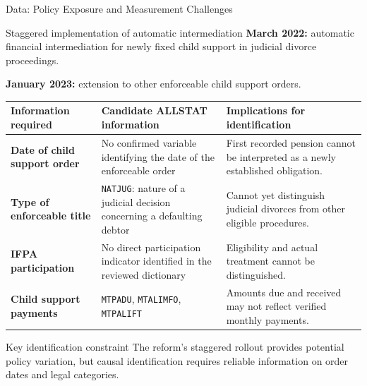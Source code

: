 \documentclass[aspectratio=169,10pt]{beamer}
\begin{document}
\begin{frame}{Data: Policy Exposure and Measurement Challenges}

\small

\begin{block}{Staggered implementation of automatic intermediation}
\textbf{March 2022:} automatic financial intermediation
for newly fixed child support in judicial divorce proceedings.

\textbf{January 2023:} extension to other enforceable
child support orders.
\end{block}

\vspace{0.12cm}

\scriptsize
\renewcommand{\arraystretch}{1.20}
\setlength{\tabcolsep}{4pt}

\begin{tabularx}{\textwidth}{
>{\bfseries}p{2.7cm} p{3.7cm} X
}
\toprule
Information required &
Candidate ALLSTAT information &
Implications for identification \\
\midrule

Date of child support order &
No confirmed variable identifying the date
of the enforceable order &
First recorded pension cannot be interpreted
as a newly established obligation. \\

Type of enforceable title &
\texttt{NATJUG}: nature of a judicial decision
concerning a defaulting debtor &
Cannot yet distinguish judicial divorces
from other eligible procedures. \\

IFPA participation &
No direct participation indicator identified
in the reviewed dictionary &
Eligibility and actual treatment
cannot be distinguished. \\

Child support payments &
\texttt{MTPADU}, \texttt{MTALIMFO},
\texttt{MTPALIFT} &
Amounts due and received may not reflect
verified monthly payments. \\

\bottomrule
\end{tabularx}

\vspace{0.12cm}

\begin{block}{Key identification constraint}
\scriptsize
The reform's staggered rollout provides potential
policy variation, but causal identification requires
reliable information on order dates and legal categories.
\end{block}

\end{frame}
\end{document}
